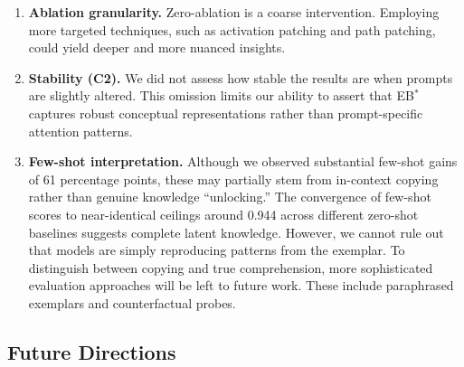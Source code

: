 \documentclass[10pt]{article} %
\begin{document}
\begin{enumerate}
  \item \textbf{Ablation granularity.} Zero-ablation is a coarse intervention.
  Employing more targeted techniques, such as activation patching and path patching, could yield deeper and more nuanced insights.

  \item \textbf{Stability (C2).} We did not assess how stable the results are when prompts are slightly altered. 
  This omission limits our ability to assert that EB$^*$ captures robust conceptual representations rather than prompt-specific attention patterns.

  \item \textbf{Few-shot interpretation.} Although we observed substantial few-shot gains of 61 percentage points, these may partially stem from in-context copying rather than genuine knowledge ``unlocking.'' The convergence of few-shot scores to near-identical ceilings around 0.944 across different zero-shot baselines suggests complete latent knowledge. However, we cannot rule out that models are simply reproducing patterns from the exemplar. To distinguish between copying and true comprehension, more sophisticated evaluation approaches will be left to future work. These include paraphrased exemplars and counterfactual probes.
\end{enumerate}

\subsection{Future Directions}
\end{document}
